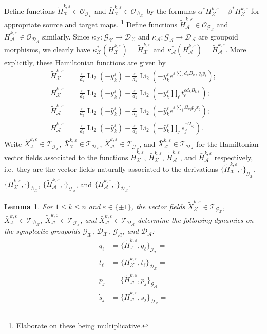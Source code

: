 \documentclass{amsart}
\newtheorem{lemma}[theorem]{Lemma}
\numberwithin{equation}{section}
\newcommand{\cA}{\mathcal{A}}
\newcommand{\cG}{\mathcal{G}}
\newcommand{\cD}{\mathcal{D}}
\newcommand{\cO}{\mathcal{O}}
\newcommand{\cX}{\mathcal{X}}
\newcommand{\cT}{\mathcal{T}}
\newcommand{\Li}{\operatorname{Li}}
\begin{document}
Define functions $\tilde H_\cX^{k,\varepsilon}\in\cO_{\cG_\cX}$ and $\bar H_\cX^{k,\varepsilon}\in\cO_{\cD_\cX}$ by the formulas $\alpha^* H_\cX^{k,\varepsilon}-\beta^* H_\cX^{k,\varepsilon}$ for appropriate source and target maps. \footnote{Elaborate on these being multiplicative.}
Define functions $\tilde H_\cA^{k,\varepsilon}\in\cO_{\cG_\cA}$ and $\bar H_\cA^{k,\varepsilon}\in\cO_{\cD_\cA}$ similarly.
Since $\kappa_\cX:\cG_\cX\to\cD_\cX$ and $\kappa_\cA:\cG_\cA\to\cD_\cA$ are groupoid morphisms, we clearly have $\kappa_\cX^*(\bar H_\cX^{k,\varepsilon})=\tilde H_\cX^{k,\varepsilon}$ and $\kappa_\cA^*(\bar H_\cA^{k,\varepsilon})=\tilde H_\cA^{k,\varepsilon}$.
More explicitly, these Hamiltonian functions are given by
\begin{align*}
  \tilde H_\cX^{k,\varepsilon}&=\frac{\varepsilon}{d_k}\Li_2(-y_k^\varepsilon)-\frac{\varepsilon}{d_k}\Li_2\left(-y_k^\varepsilon e^{\varepsilon\sum_\ell d_kB_{k\ell}q_\ell y_\ell}\right);\\
  \bar H_\cX^{k,\varepsilon}&=\frac{\varepsilon}{d_k}\Li_2(-y_k^\varepsilon)-\frac{\varepsilon}{d_k}\Li_2\left(-y_k^\varepsilon\prod_\ell t_\ell^{\varepsilon d_kB_{k\ell}}\right);\\
  \tilde H_\cA^{k,\varepsilon}&=\frac{\varepsilon}{d_k}\Li_2(-\hat y_k^\varepsilon)-\frac{\varepsilon}{d_k}\Li_2\left(-\hat y_k^\varepsilon e^{\varepsilon\sum_j\Omega_{kj}p_jx_j}\right);\\
  \bar H_\cA^{k,\varepsilon}&=\frac{\varepsilon}{d_k}\Li_2(-\hat y_k^\varepsilon)-\frac{\varepsilon}{d_k}\Li_2\left(-\hat y_k^\varepsilon\prod_j s_j^{\varepsilon \Omega_{kj}}\right).
\end{align*}
Write $\tilde X_\cX^{k,\varepsilon}\in\cT_{\cG_\cX}$, $\bar X_\cX^{k,\varepsilon}\in\cT_{\cD_\cX}$, $\tilde X_\cA^{k,\varepsilon}\in\cT_{\cG_\cA}$, and $\bar X_\cA^{k,\varepsilon}\in\cT_{\cD_\cA}$ for the Hamiltonian vector fields associated to the functions $\tilde H_\cX^{k,\varepsilon}$, $\bar H_\cX^{k,\varepsilon}$, $\tilde H_\cA^{k,\varepsilon}$, and $\bar H_\cA^{k,\varepsilon}$ respectively, i.e.\ they are the vector fields naturally associated to the derivations $\{\tilde H_\cX^{k,\varepsilon},\cdot\}_{\cG_\cX}$, $\{\bar H_\cX^{k,\varepsilon},\cdot\}_{\cD_\cX}$, $\{\tilde H_\cA^{k,\varepsilon},\cdot\}_{\cG_\cA}$, and $\{\bar H_\cA^{k,\varepsilon},\cdot\}_{\cD_\cA}$.
\begin{lemma}
  For $1\le k\le n$ and $\varepsilon\in\{\pm1\}$, the vector fields $\tilde X_\cX^{k,\varepsilon}\in\cT_{\cG_\cX}$, $\bar X_\cX^{k,\varepsilon}\in\cT_{\cD_\cX}$, $\tilde X_\cA^{k,\varepsilon}\in\cT_{\cG_\cA}$, and $\bar X_\cA^{k,\varepsilon}\in\cT_{\cD_\cA}$ determine the following dynamics on the symplectic groupoids $\cG_\cX$, $\cD_\cX$, $\cG_\cA$, and $\cD_\cA$:
  \begin{align}
    \dot q_\ell&=\{\tilde H_\cX^{k,\varepsilon},q_\ell\}_{\cG_\cX}=\\
    \dot t_\ell&=\{\bar H_\cX^{k,\varepsilon},t_\ell\}_{\cD_\cX}=\\
    \dot p_j&=\{\tilde H_\cA^{k,\varepsilon},p_j\}_{\cG_\cA}=\\
    \dot s_j&=\{\bar H_\cA^{k,\varepsilon},s_j\}_{\cD_\cA}=
  \end{align}
\end{lemma}
\end{document}

